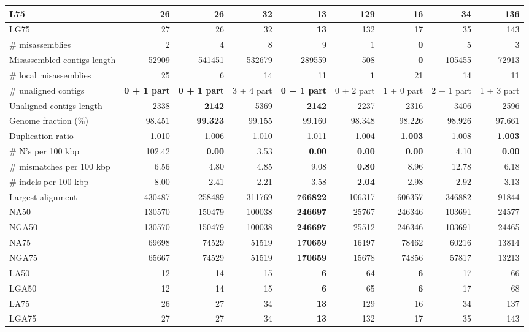 \documentclass[12pt,a4paper]{article}
\begin{document}
\begin{table}[ht]
\begin{center}
\begin{tabular}{|l*{8}{|r}|}
L75 & 26 & 26 & 32 & {\bf 13} & 129 & 16 & 34 & 136 \\ \hline
LG75 & 27 & 26 & 32 & {\bf 13} & 132 & 17 & 35 & 143 \\ \hline
\# misassemblies & 2 & 4 & 8 & 9 & 1 & {\bf 0} & 5 & 3 \\ \hline
Misassembled contigs length & 52909 & 541451 & 532679 & 289559 & 508 & {\bf 0} & 105455 & 72913 \\ \hline
\# local misassemblies & 25 & 6 & 14 & 11 & {\bf 1} & 21 & 14 & 11 \\ \hline
\# unaligned contigs & {\bf 0 + 1 part} & {\bf 0 + 1 part} & 3 + 4 part & {\bf 0 + 1 part} & 0 + 2 part & 1 + 0 part & 2 + 1 part & 1 + 3 part \\ \hline
Unaligned contigs length & 2338 & {\bf 2142} & 5369 & {\bf 2142} & 2237 & 2316 & 3406 & 2596 \\ \hline
Genome fraction (\%) & 98.451 & {\bf 99.323} & 99.155 & 99.160 & 98.348 & 98.226 & 98.926 & 97.661 \\ \hline
Duplication ratio & 1.010 & 1.006 & 1.010 & 1.011 & 1.004 & {\bf 1.003} & 1.008 & {\bf 1.003} \\ \hline
\# N's per 100 kbp & 102.42 & {\bf 0.00} & 3.53 & {\bf 0.00} & {\bf 0.00} & {\bf 0.00} & 4.10 & {\bf 0.00} \\ \hline
\# mismatches per 100 kbp & 6.56 & 4.80 & 4.85 & 9.08 & {\bf 0.80} & 8.96 & 12.78 & 6.18 \\ \hline
\# indels per 100 kbp & 8.00 & 2.41 & 2.21 & 3.58 & {\bf 2.04} & 2.98 & 2.92 & 3.13 \\ \hline
Largest alignment & 430487 & 258489 & 311769 & {\bf 766822} & 106317 & 606357 & 346882 & 91844 \\ \hline
NA50 & 130570 & 150479 & 100038 & {\bf 246697} & 25767 & 246346 & 103691 & 24577 \\ \hline
NGA50 & 130570 & 150479 & 100038 & {\bf 246697} & 25512 & 246346 & 103691 & 24465 \\ \hline
NA75 & 69698 & 74529 & 51519 & {\bf 170659} & 16197 & 78462 & 60216 & 13814 \\ \hline
NGA75 & 65667 & 74529 & 51519 & {\bf 170659} & 15678 & 74856 & 57817 & 13213 \\ \hline
LA50 & 12 & 14 & 15 & {\bf 6} & 64 & {\bf 6} & 17 & 66 \\ \hline
LGA50 & 12 & 14 & 15 & {\bf 6} & 65 & {\bf 6} & 17 & 68 \\ \hline
LA75 & 26 & 27 & 34 & {\bf 13} & 129 & 16 & 34 & 137 \\ \hline
LGA75 & 27 & 27 & 34 & {\bf 13} & 132 & 17 & 35 & 143 \\ \hline
\end{tabular}
\end{center}
\end{table}
\end{document}
